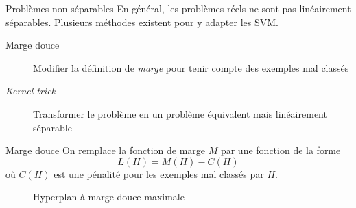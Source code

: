 \documentclass[hyperref={unicode}, xcolor={svgnames}, french]{beamer}
\begin{document}

\begin{frame}{Problèmes non-séparables}
    En général, les problèmes réels ne sont pas linéairement séparables.
    Plusieurs méthodes existent pour y adapter les SVM.
    \begin{description}
        \item[Marge douce] Modifier la définition de \emph{marge} pour tenir compte des exemples mal classés
        \item[\emph{Kernel trick}] Transformer le problème en un problème équivalent mais linéairement séparable
    \end{description}
\end{frame}

\begin{frame}{Marge douce}
    On remplace la fonction de marge $M$ par une fonction de la forme
    \begin{equation}
        L(H) = M(H) - C(H)
    \end{equation}
    où $C(H)$ est une pénalité pour les exemples mal classés par $H$.
    \begin{figure}
        \tikzset{external/export=true}
        \caption{Hyperplan à marge douce maximale}
    \end{figure}
\end{frame}
\end{document}
